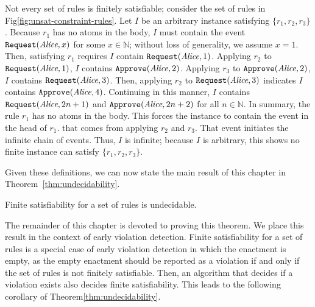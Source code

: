 \begin{examp}\label{example:not-finitely-satisfiable}
Not every set of rules is finitely satisfiable;
consider the set of rules in Fig\:\ref{fig:unsat-constraint-rules}.
Let $I$ be an arbitrary instance satisfying
$\{r_1, r_2, r_3\}$.
Because $r_1$ has no atoms in the body,
$I$ must contain the event
$\texttt{Request}(\mbox{\em Alice}, x)$
for some $x\in \mathbb{N}$;
without loss of generality,
we assume $x=1$.
Then, satisfying $r_1$ requires $I$ contain
$\texttt{Request}(\mbox{\em Alice}, 1)$.
Applying $r_2$ to $\texttt{Request}(\mbox{\em Alice}, 1)$,
$I$ contains $\texttt{Approve}(\mbox{\em Alice}, 2)$.
Applying $r_3$ to $\texttt{Approve}(\mbox{\em Alice}, 2)$,
$I$ contains $\texttt{Request}(\mbox{\em Alice}, 3)$.
Then, applying $r_2$ to $\texttt{Request}(\mbox{\em Alice}, 3)$
indicates $I$ contains $\texttt{Approve}(\mbox{\em Alice}, 4)$.
Continuing in this manner,
$I$ contains $\texttt{Request}(\mbox{\em Alice}, 2n+1)$
and $\texttt{Approve}(\mbox{\em Alice}, 2n+2)$ for all $n\in \mathbb{N}$.
In summary,
the rule $r_1$ has no atoms in the body.
This forces the instance to contain
the event in the head of $r_1$.
that comes from applying $r_2$ and $r_3$.
That event
initiates the infinite chain of events.
Thus, $I$ is infinite;
because $I$ is arbitrary,
this shows no finite instance
can satisfy $\{r_1, r_2, r_3\}$.
\end{examp}

Given these definitions,
we can now state the main result of this chapter
in Theorem\:~\ref{thm:undecidability}.

\begin{thm}\label{thm:undecidability}
Finite satisfiability for a set of rules is undecidable.
\end{thm}

The remainder of this chapter is devoted to proving this theorem.
We place this result
in the context of early violation detection.
Finite satisfiability for a set of rules
is a special case of early violation detection
in which the enactment is empty,
as the empty enactment should be reported 
as a violation
if and only if the set of rules is not finitely satisfiable.
Then,
an algorithm that decides if a violation exists
also decides finite satisfiability.
This leads to the following corollary
of Theorem\:\ref{thm:undecidability}.
    
